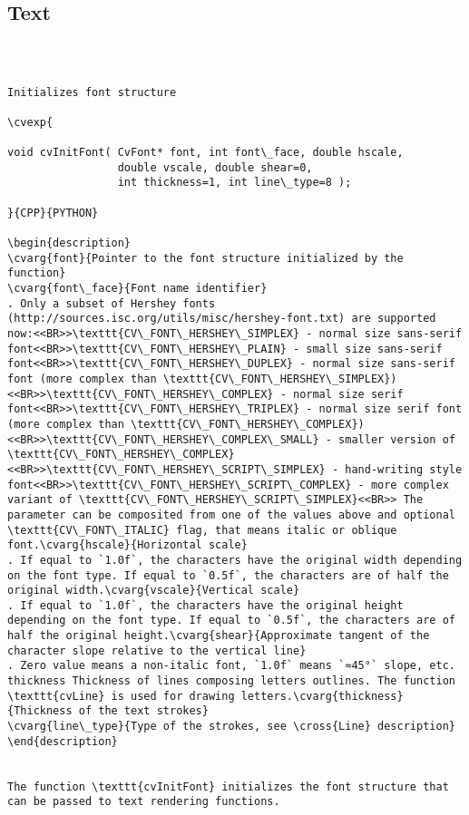 \subsection{Text}
\begin{verbatim}


\end{verbatim}
\begin{verbatim}

Initializes font structure

\cvexp{

void cvInitFont( CvFont* font, int font\_face, double hscale,
                 double vscale, double shear=0,
                 int thickness=1, int line\_type=8 );

}{CPP}{PYTHON}

\begin{description}
\cvarg{font}{Pointer to the font structure initialized by the function}
\cvarg{font\_face}{Font name identifier}
. Only a subset of Hershey fonts (http://sources.isc.org/utils/misc/hershey-font.txt) are supported now:<<BR>>\texttt{CV\_FONT\_HERSHEY\_SIMPLEX} - normal size sans-serif font<<BR>>\texttt{CV\_FONT\_HERSHEY\_PLAIN} - small size sans-serif font<<BR>>\texttt{CV\_FONT\_HERSHEY\_DUPLEX} - normal size sans-serif font (more complex than \texttt{CV\_FONT\_HERSHEY\_SIMPLEX})<<BR>>\texttt{CV\_FONT\_HERSHEY\_COMPLEX} - normal size serif font<<BR>>\texttt{CV\_FONT\_HERSHEY\_TRIPLEX} - normal size serif font (more complex than \texttt{CV\_FONT\_HERSHEY\_COMPLEX})<<BR>>\texttt{CV\_FONT\_HERSHEY\_COMPLEX\_SMALL} - smaller version of \texttt{CV\_FONT\_HERSHEY\_COMPLEX}<<BR>>\texttt{CV\_FONT\_HERSHEY\_SCRIPT\_SIMPLEX} - hand-writing style font<<BR>>\texttt{CV\_FONT\_HERSHEY\_SCRIPT\_COMPLEX} - more complex variant of \texttt{CV\_FONT\_HERSHEY\_SCRIPT\_SIMPLEX}<<BR>> The parameter can be composited from one of the values above and optional \texttt{CV\_FONT\_ITALIC} flag, that means italic or oblique font.\cvarg{hscale}{Horizontal scale}
. If equal to `1.0f`, the characters have the original width depending on the font type. If equal to `0.5f`, the characters are of half the original width.\cvarg{vscale}{Vertical scale}
. If equal to `1.0f`, the characters have the original height depending on the font type. If equal to `0.5f`, the characters are of half the original height.\cvarg{shear}{Approximate tangent of the character slope relative to the vertical line}
. Zero value means a non-italic font, `1.0f` means `≈45°` slope, etc. thickness Thickness of lines composing letters outlines. The function \texttt{cvLine} is used for drawing letters.\cvarg{thickness}{Thickness of the text strokes}
\cvarg{line\_type}{Type of the strokes, see \cross{Line} description}
\end{description}


The function \texttt{cvInitFont} initializes the font structure that can be passed to text rendering functions.


\end{verbatim}
